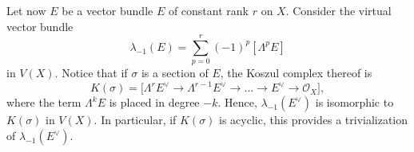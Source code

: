 \documentclass[11pt]{article}
\theoremstyle{plain}
\theoremstyle{definition}
\newcommand{\Ocal}{\mathcal O}
\begin{document}
Let now $E$ be a vector bundle $E$ of constant rank $r$ on $X$. Consider the virtual vector bundle
\begin{equation}\label{eq:lambda-1def}
\lambda_{-1}(E) = \sum_{p=0}^r (-1)^p [\Lambda^p E]
\end{equation}
in $V(X)$. Notice that if $\sigma$ is a section of $E$, the Koszul complex thereof is
\begin{equation}\label{def:lambdaKosz}
K(\sigma) = \bigl[\Lambda^r E^\vee \to \Lambda^{r-1} E^\vee \to \ldots \to E^{\vee} \to \Ocal_X\bigr],
\end{equation}
where the term $\Lambda^{k}E$ is placed in degree $-k$. Hence, $\lambda_{-1}(E^\vee)$ is isomorphic to $K(\sigma)$ in $V(X)$. In particular, if $K(\sigma)$ is acyclic, this provides a trivialization of $\lambda_{-1}(E^{\vee})$.
\end{document}
